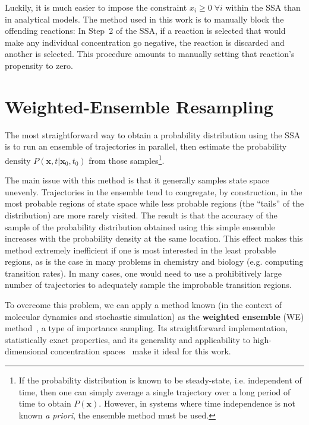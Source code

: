\documentclass[english,letterpaper,12pt]{report}
\newcommand{\defkeywd}[1]{\textbf{#1}}
\renewcommand{\vec}[1]{\ensuremath{\mathbf{#1}}}
\begin{document}
\begin{doublespacing}
Luckily, it is much easier to impose the constraint $x_i \geq 0\; \forall i$ within the SSA than in analytical models. The method used in this work is to manually block the offending reactions: In Step~2 of the SSA, if a reaction is selected that would make any individual concentration go negative, the reaction is discarded and another is selected. This procedure amounts to manually setting that reaction's propensity to zero.


\section{Weighted-Ensemble Resampling} %
\label{sub:we-resampling-intro}

The most straightforward way to obtain a probability distribution using the SSA is to run an ensemble of trajectories in parallel, then estimate the probability density $P(\vec{x}, t | \vec{x}_0, t_0)$ from those samples\footnote{If the probability distribution is known to be steady-state, i.e. independent of time, then one can simply average a single trajectory over a long period of time to obtain $P(\vec{x})$. However, in systems where time independence is not known \textit{a priori}, the ensemble method must be used.}.

The main issue with this method is that it generally samples state space unevenly. Trajectories in the ensemble tend to congregate, by construction, in the most probable regions of state space while less probable regions (the ``tails'' of the distribution) are more rarely visited. The result is that the accuracy of the sample of the probability distribution obtained using this simple ensemble increases with the probability density at the same location. This effect makes this method extremely inefficient if one is most interested in the least probable regions, as is the case in many problems in chemistry and biology (e.g. computing transition rates). In many cases, one would need to use a prohibitively large number of trajectories to adequately sample the improbable transition regions.

To overcome this problem, we can apply a method known (in the context of molecular dynamics and stochastic simulation) as the \defkeywd{weighted ensemble} (WE) method~\cite{we-orig}, a type of importance sampling. Its straightforward implementation, statistically exact properties, and its generality and applicability to high-dimensional concentration spaces~\cite{we-exact}\cite{we-chemkin} make it ideal for this work.


\end{doublespacing}
\end{document}
